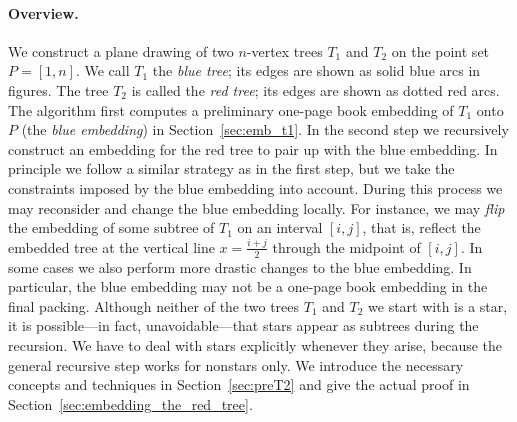\documentclass[11pt,a4paper,colorlinks=true,urlcolor=blue,citecolor=red]{article}
\theoremstyle{plain}
\newcommand{\subsubparagraph}[1]{\paragraph{#1}}
\begin{document}
\subsubparagraph{Overview.} We construct a plane drawing of two $n$-vertex trees $T_1$ and $T_2$ on the point set
$P=[1,n]$. We call $T_1$ the \emph{blue tree}; its edges are shown as
solid blue arcs in figures. The tree $T_2$ is called the \emph{red
  tree}; its edges are shown as dotted red arcs. The algorithm first
computes a preliminary one-page book embedding of $T_1$ onto $P$ (the
\emph{blue embedding}) in Section~\ref{sec:emb_t1}. In the second step
we recursively construct an embedding for the red tree to pair up with
the blue embedding. In principle we follow a similar strategy as in the
first step, but we take the constraints imposed by the blue embedding
into account. During this process we may reconsider and change the blue
embedding locally. For instance, we may \emph{flip} the embedding of
some subtree of $T_1$ on an interval $[i,j]$, that is, reflect the
embedded tree at the vertical line $x=\frac{i+j}{2}$ through the
midpoint of $[i,j]$. In some cases we also perform more drastic changes
to the blue embedding. In particular, the blue embedding may not be a
one-page book embedding in the final packing. Although neither of the
two trees $T_1$ and $T_2$ we start with is a star, it is possible---in
fact, unavoidable---that stars appear as subtrees during the recursion.
We have to deal with stars explicitly whenever they arise, because the
general recursive step works for nonstars only. We introduce the
necessary concepts and techniques in Section~\ref{sec:preT2} and give
the actual proof in Section~\ref{sec:embedding_the_red_tree}.
\end{document}
